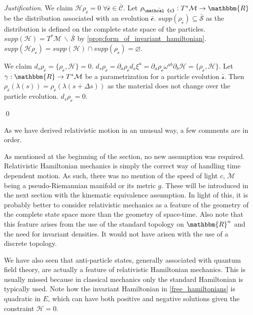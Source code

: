\documentclass[aps,pra,10pt,twocolumn,floatfix,nofootinbib]{revtex4-1}
\numberwithin{equation}{section}
\theoremstyle{definition}
\newenvironment{justification}{\emph{Justification}.}{\qed}
\begin{document}
\begin{justification}
	We claim $\mathcal{H} \rho_{\bar{\mathcal{c}}} = 0 \; \forall \bar{\mathcal{c}} \in \bar{\mathcal{C}}$. Let $\rho_{\bar{\mathcal{c}}} : T^*\mathcal{M} \rightarrow \mathbbm{R}$ be the distribution associated with an evolution $\bar{\mathcal{c}}$. $supp(\rho_{\bar{\mathcal{c}}}) \subseteq \bar{\mathcal{S}}$ as the distribution is defined on the complete state space of the particles. $supp(\mathcal{H}) = T^*\mathcal{M} \,\backslash\, \bar{\mathcal{S}}$ by \ref{prop:form_of_invariant_hamiltonian}. $supp(\mathcal{H} \rho_\mathcal{c}) = supp(\mathcal{H}) \cap supp(\rho_\mathcal{c}) = \varnothing$.
	
	We claim $d_s \rho_{\bar{\mathcal{c}}} = \{ \rho_{\bar{\mathcal{c}}}, \mathcal{H} \} = 0$. $d_s \rho_{\bar{\mathcal{c}}}= \partial_a \rho_{\bar{\mathcal{c}}} d_s \xi^a = \partial_a \rho_{\bar{\mathcal{c}}} \omega^{ab} \partial_b \mathcal{H} = \{ \rho_{\bar{\mathcal{c}}}, \mathcal{H} \}$. Let $\gamma : \mathbbm{R} \rightarrow T^*\mathcal{M}$ be a parametrization for a particle evolution $\bar{\mathcal{s}}$. Then $\rho_{\bar{\mathcal{c}}}(\lambda(s)) = \rho_{\bar{\mathcal{c}}}(\lambda(s + \Delta s))$ as the material does not change over the particle evolution. $d_s \rho_{\bar{\mathcal{c}}} = 0$.
	
\end{justification}

As we have derived relativistic motion in an unusual way, a few comments are in order.

As mentioned at the beginning of the section, no new assumption was required. Relativistic Hamiltonian mechanics is simply the correct way of handling time dependent motion. As such, there was no mention of the speed of light $c$, $\mathcal{M}$ being a pseudo-Riemannian manifold or its metric $g$. These will be introduced in the next section with the kinematic equivalence assumption. In light of this, it is probably better to consider relativistic mechanics as a feature of the geometry of the complete state space more than the geometry of space-time. Also note that this feature arises from the use of the standard topology on $\mathbbm{R}^n$ and the need for invariant densities. It would not have arisen with the use of a discrete topology.

We have also seen that anti-particle states, generally associated with quantum field theory, are actually a feature of relativistic Hamiltonian mechanics. This is usually missed because in classical mechanics only the standard Hamiltonian is typically used. Note how the invariant Hamiltonian in \ref{free_hamiltonians} is quadratic in $E$, which can have both positive and negative solutions given the constraint $\mathcal{H}=0$.
\end{document}
